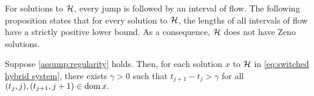 For solutions to ${\mathcal{H}}$, every jump is followed by an interval of flow.
The following proposition states that for every solution to ${\mathcal{H}}$,
the lengths of all intervals of flow have a strictly positive lower bound.
As a consequence, ${\mathcal{H}}$ does not have Zeno solutions.%
\begin{proposition} %
    Suppose \cref{assump:regularity} holds.
    Then, for each solution $x$ 
    to ${\mathcal{H}}$ in \cref{eq:switched hybrid system}, 
    there exists $\gamma > 0$ 
    such that $t_{j+1} - t_j > \gamma$ 
    for all $(t_j, j), (t_{j+1}, j+1) \in \operatorname{dom} x.$%
    \label{lem:no Zeno}
\end{proposition} 

